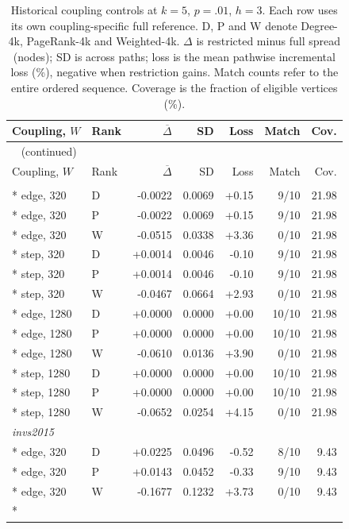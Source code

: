 \begin{longtable}{llrrrrr}
\caption{Historical coupling controls at $k=5$, $p=.01$, $h=3$. Each row uses its own coupling-specific full reference. D, P and W denote Degree-4k, PageRank-4k and Weighted-4k. $\Delta$ is restricted minus full spread (nodes); SD is across paths; loss is the mean pathwise incremental loss (\%), negative when restriction gains. Match counts refer to the entire ordered sequence. Coverage is the fraction of eligible vertices (\%).}\label{tab:hist-coupling}\\
\toprule
Coupling, $W$ & Rank & $\overline\Delta$ & SD & Loss & Match & Cov. \\
\midrule
\endfirsthead
\multicolumn{7}{l}{\tablename~\thetable{} (continued)}\\
\toprule
Coupling, $W$ & Rank & $\overline\Delta$ & SD & Loss & Match & Cov. \\
\midrule
\endhead
\bottomrule
\endfoot
\multicolumn{7}{l}{\textit{invs2013}}\\*
edge, 320 & D & -0.0022 & 0.0069 & +0.15 & 9/10 & 21.98\\*
edge, 320 & P & -0.0022 & 0.0069 & +0.15 & 9/10 & 21.98\\*
edge, 320 & W & -0.0515 & 0.0338 & +3.36 & 0/10 & 21.98\\*
step, 320 & D & +0.0014 & 0.0046 & -0.10 & 9/10 & 21.98\\*
step, 320 & P & +0.0014 & 0.0046 & -0.10 & 9/10 & 21.98\\*
step, 320 & W & -0.0467 & 0.0664 & +2.93 & 0/10 & 21.98\\*
edge, 1280 & D & +0.0000 & 0.0000 & +0.00 & 10/10 & 21.98\\*
edge, 1280 & P & +0.0000 & 0.0000 & +0.00 & 10/10 & 21.98\\*
edge, 1280 & W & -0.0610 & 0.0136 & +3.90 & 0/10 & 21.98\\*
step, 1280 & D & +0.0000 & 0.0000 & +0.00 & 10/10 & 21.98\\*
step, 1280 & P & +0.0000 & 0.0000 & +0.00 & 10/10 & 21.98\\*
step, 1280 & W & -0.0652 & 0.0254 & +4.15 & 0/10 & 21.98\\
\multicolumn{7}{l}{\textit{invs2015}}\\*
edge, 320 & D & +0.0225 & 0.0496 & -0.52 & 8/10 & 9.43\\*
edge, 320 & P & +0.0143 & 0.0452 & -0.33 & 9/10 & 9.43\\*
edge, 320 & W & -0.1677 & 0.1232 & +3.73 & 0/10 & 9.43\\*

\end{longtable}
